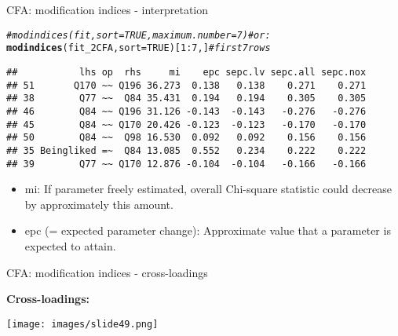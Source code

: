 \documentclass[10pt]{beamer}\usepackage[]{graphicx}\usepackage[]{xcolor}
\makeatletter
\newcommand{\hlnum}[1]{\textcolor[rgb]{0.686,0.059,0.569}{#1}}%
\newcommand{\hlcom}[1]{\textcolor[rgb]{0.678,0.584,0.686}{\textit{#1}}}%
\newcommand{\hlopt}[1]{\textcolor[rgb]{0,0,0}{#1}}%
\newcommand{\hldef}[1]{\textcolor[rgb]{0.345,0.345,0.345}{#1}}%
\newcommand{\hlkwc}[1]{\textcolor[rgb]{0.333,0.667,0.333}{#1}}%
\newcommand{\hlkwd}[1]{\textcolor[rgb]{0.737,0.353,0.396}{\textbf{#1}}}%
\newenvironment{kframe}{%
 \def\at@end@of@kframe{}%
 \ifinner\ifhmode%
  \def\at@end@of@kframe{\end{minipage}}%
  \begin{minipage}{\columnwidth}%
 \fi\fi%
 \def\FrameCommand##1{\hskip\@totalleftmargin \hskip-\fboxsep
 \colorbox{shadecolor}{##1}\hskip-\fboxsep
     \hskip-\linewidth \hskip-\@totalleftmargin \hskip\columnwidth}%
 \MakeFramed {\advance\hsize-\width
   \@totalleftmargin\z@ \linewidth\hsize
   \@setminipage}}%
 {\par\unskip\endMakeFramed%
 \at@end@of@kframe}
\newenvironment{knitrout}{}{} %
\makeatother
\begin{document}
%
\begin{frame}[fragile]{CFA: modification indices - interpretation}


\begin{knitrout}
\color{fgcolor}\begin{kframe}
\begin{alltt}
\hlcom{#modindices(fit, sort = TRUE, maximum.number = 7) # or:}
\hlkwd{modindices}\hldef{(fit_2CFA,} \hlkwc{sort} \hldef{=} \hlnum{TRUE}\hldef{)[}\hlnum{1}\hlopt{:}\hlnum{7}\hldef{,]} \hlcom{# first 7 rows}
\end{alltt}
\begin{verbatim}
##           lhs op  rhs     mi    epc sepc.lv sepc.all sepc.nox
## 51       Q170 ~~ Q196 36.273  0.138   0.138    0.271    0.271
## 38        Q77 ~~  Q84 35.431  0.194   0.194    0.305    0.305
## 46        Q84 ~~ Q196 31.126 -0.143  -0.143   -0.276   -0.276
## 45        Q84 ~~ Q170 20.426 -0.123  -0.123   -0.170   -0.170
## 50        Q84 ~~  Q98 16.530  0.092   0.092    0.156    0.156
## 35 Beingliked =~  Q84 13.085  0.552   0.234    0.222    0.222
## 39        Q77 ~~ Q170 12.876 -0.104  -0.104   -0.166   -0.166
\end{verbatim}
\end{kframe}
\end{knitrout}

\begin{itemize}
  \item mi: If parameter freely estimated, overall Chi-square statistic could decrease by approximately this amount.
  \item epc (= expected parameter change): Approximate value that a parameter is expected to attain.
\end{itemize}

\end{frame}
%
\begin{frame}{CFA: modification indices - cross-loadings}

\textbf{Cross-loadings:} \vspace{5mm}

\texttt{[image: images/slide49.png]} 

\end{frame}
\end{document}
